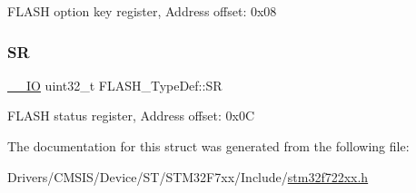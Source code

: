 F\+L\+A\+SH option key register, Address offset\+: 0x08 \mbox{\label{struct_f_l_a_s_h___type_def_a52c4943c64904227a559bf6f14ce4de6}} 
\subsubsection{\texorpdfstring{SR}{SR}}
{\footnotesize\ttfamily \mbox{\hyperlink{core__sc300_8h_aec43007d9998a0a0e01faede4133d6be}{\+\_\+\+\_\+\+IO}} uint32\+\_\+t F\+L\+A\+S\+H\+\_\+\+Type\+Def\+::\+SR}

F\+L\+A\+SH status register, Address offset\+: 0x0C 

The documentation for this struct was generated from the following file\+:\begin{DoxyCompactItemize}
\item 
Drivers/\+C\+M\+S\+I\+S/\+Device/\+S\+T/\+S\+T\+M32\+F7xx/\+Include/\mbox{\hyperlink{stm32f722xx_8h}{stm32f722xx.\+h}}\end{DoxyCompactItemize}
